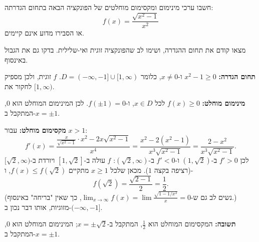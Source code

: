 
\begin{question}
חשבו ערכי מינימום ומקסימום מוחלטים של הפונקציה הבאה בתחום הגדרתה:
\[ f(x)=\frac{\sqrt{x^2-1}}{x^2} \]
או הסבירו מדוע אינם קיימים.
\end{question}

\begin{hint}
מצאו קודם את תחום ההגדרה, ושימו לב שהפונקציה זוגית ואי-שלילית. בדקו גם את הגבול באינסוף.
\end{hint}

\begin{solution}
\textbf{תחום הגדרה:} $x^2-1\ge0$ ו-$x\neq0$, כלומר $D=(-\infty,-1]\cup[1,\infty)$.
$f$ זוגית, ולכן מספיק לחקור את $[1,\infty)$.

\textbf{מינימום מוחלט:} $f(x)\ge0$ לכל $x\in D$, ו-$f(\pm1)=0$. לכן המינימום המוחלט הוא $\boxed{0}$, המתקבל ב-$x=\pm1$.

\textbf{מקסימום מוחלט:} עבור $x>1$:
\[ f'(x)=\frac{\frac{x}{\sqrt{x^2-1}}\cdot x^2-2x\sqrt{x^2-1}}{x^4}=\frac{x^2-2(x^2-1)}{x^3\sqrt{x^2-1}}=\frac{2-x^2}{x^3\sqrt{x^2-1}}. \]
לכן $f'>0$ ב-$(1,\sqrt2)$ ו-$f'<0$ ב-$(\sqrt2,\infty)$: $f$ עולה ב-$[1,\sqrt2]$ ויורדת ב-$[\sqrt2,\infty)$ (רציפה בקצה $1$). מכאן שלכל $x\ge1$ מתקיים $f(x)\le f(\sqrt2)$, ו-
\[ f(\sqrt2)=\frac{\sqrt{2-1}}{2}=\frac12. \]
(נשים לב גם ש-$\lim_{x\to\infty}f(x)=\lim\frac{\sqrt{1-1/x^2}}{x}=0$, כך שאין "בריחה" באינסוף.) מזוגיות, אותו דבר נכון ב-$(-\infty,-1]$.

\textbf{תשובה:} המקסימום המוחלט הוא $\boxed{\tfrac12}$, המתקבל ב-$x=\pm\sqrt2$; המינימום המוחלט הוא $\boxed{0}$, המתקבל ב-$x=\pm1$.
\end{solution}

